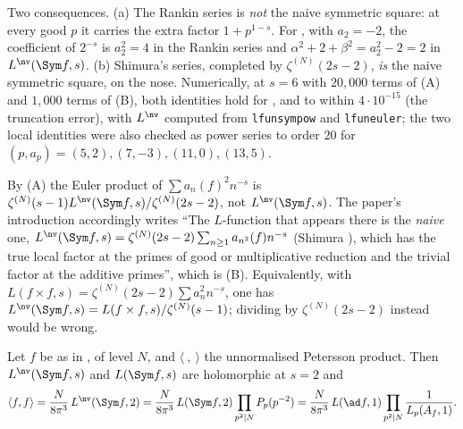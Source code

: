 Two consequences. (a) The Rankin series is \emph{not} the naive symmetric square: at every good $p$ it carries the extra factor $1+p^{1-s}$. For , with
$a_2=-2$, the coefficient of $2^{-s}$ is $a_2^2=4$ in the Rankin series and $\alpha^2+2+\beta^2=a_2^2-2=2$ in $L^{\nv}(\Sym f,s)$. (b) Shimura's series, completed by $\zeta^{(N)}(2s-2)$,
\emph{is} the naive symmetric square, on the nose. Numerically, at $s=6$ with $20{,}000$ terms of (A) and $1{,}000$ terms of (B), both identities hold for ,
 and  to within $4\cdot10^{-15}$ (the truncation error), with $L^{\nv}$ computed from \texttt{lfunsympow} and \texttt{lfuneuler}; the two local identities
were also checked as power series to order $20$ for $(p,a_p)=(5,2),(7,-3),(11,0),(13,5)$.

\begin{warning}\label{warn:lfunctions:rankin}
By (A) the Euler product of $\sum a_n(f)^2n^{-s}$ is $\zeta^{(N)}(s-1)L^{\nv}(\Sym f,s)/\zeta^{(N)}(2s-2)$, not $L^{\nv}(\Sym f,s)$. The paper's
introduction accordingly writes ``The $L$-function that appears there is the \emph{naive} one, $L^{\nv}(\Sym f,s)=\zeta^{(N)}(2s-2)\sum_{n\ge1}a_{n^2}(f)n^{-s}$ (Shimura \cite{Shimura75}), which has the
true local factor at the primes of good or multiplicative reduction and the trivial factor at the additive primes'', which is (B).
Equivalently, with $L(f\times f,s)=\zeta^{(N)}(2s-2)\sum a_n^2n^{-s}$, one has $L^{\nv}(\Sym f,s)=L(f\times f,s)/\zeta^{(N)}(s-1)$; dividing by $\zeta^{(N)}(2s-2)$ instead would be wrong.
\end{warning}

\begin{theorem}\label{thm:lfunctions:petersson-sym2}
Let $f$ be as in , of level $N$, and $\langle\ ,\ \rangle$ the unnormalised Petersson product. Then $L^{\nv}(\Sym f,s)$ and $L(\Sym f,s)$ are holomorphic at
$s=2$ and
\[
\langle f,f\rangle=\frac N{8\pi^3}\,L^{\nv}(\Sym f,2)=\frac N{8\pi^3}\,L(\Sym f,2)\prod_{p^2\mid N}P_p(p^{-2})=\frac N{8\pi^3}\,L(\ad f,1)\prod_{p^2\mid N}\frac1{L_p(A_f,1)}.
\]
\end{theorem}

